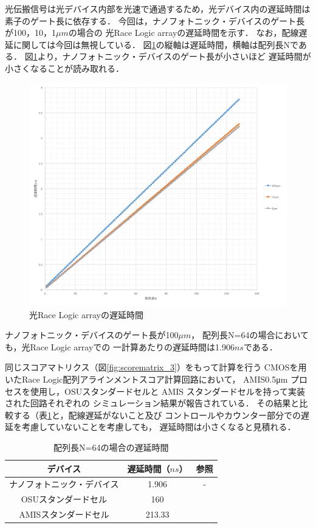 光伝搬信号は光デバイス内部を光速で通過するため，光デバイス内の遅延時間は素子のゲート長に依存する．
今回は，ナノフォトニック・デバイスのゲート長が100，10，1$\mu m$の場合の
光Race Logic arrayの遅延時間を示す．
なお，配線遅延に関しては今回は無視している．
図\ref{fig:nanolatency}の縦軸は遅延時間，横軸は配列長Nである．
図\ref{fig:nanolatency}より，ナノフォトニック・デバイスのゲート長が小さいほど
遅延時間が小さくなることが読み取れる．
\begin{figure}[t!]
\begin{center}
\includegraphics[keepaspectratio,scale=0.5]{fig/4/nanolatency.png}
\caption{光Race Logic arrayの遅延時間}
\label{fig:nanolatency}
\end{center}
\end{figure}

ナノフォトニック・デバイスのゲート長が100$\mu m$，
配列長N=64の場合においても，光Race Logic arrayでの
一計算あたりの遅延時間は1.906$ns$である．

同じスコアマトリクス（図\ref{fig:scorematrix_3}）をもって計算を行う
CMOSを用いたRace Logic配列アラインメントスコア計算回路において，
AMIS0.5μm プロセスを使用し，OSUスタンダードセルと
AMIS スタンダードセルを持って実装された回路それぞれの
シミュレーション結果が報告されている\cite {madhavan20174}．
その結果と比較する（表\ref{latency_64}と，配線遅延がないこと及び
コントロールやカウンター部分での遅延を考慮していないことを考慮しても，
遅延時間は小さくなると見積れる．

\begin{table}[t!]
\begin{center}
\caption{配列長N=64の場合の遅延時間}
\begin{tabular}{|c|c|c|} \hline
デバイス&遅延時間（$ns$）&参照\\ \hline \hline
ナノフォトニック・デバイス&1.906&-\\ \hline
OSUスタンダードセル&160&\cite{madhavan2014race}\\ \hline
AMISスタンダードセル&213.33&\cite{madhavan2014race}\\ \hline
\end{tabular}
\label{latency_64}
\end{center}
\end{table}

